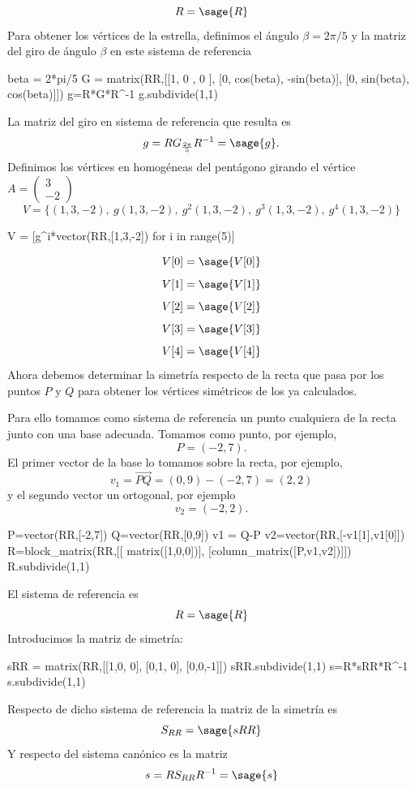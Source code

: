 \documentclass{amsart}
\begin{document}
 \[R= \sage{R} \]
Para obtener los vértices de la estrella, definimos el ángulo $\beta = 2\pi/5$ y la matriz del giro de ángulo $\beta$ en este sistema de referencia

\begin{sageblock}
beta = 2*pi/5
G = matrix(RR,[[1, 0        ,  0        ],
            [0, cos(beta), -sin(beta)],
            [0, sin(beta),  cos(beta)]])
g=R*G*R^-1
g.subdivide(1,1)
\end{sageblock}

La matriz del giro en sistema de referencia que resulta es \[g=RG_{\frac{2\pi}{5}} R^{-1}= \sage{g}.\]
Definimos los vértices en homogéneas del pentágono girando el vértice $A = \left( \begin{array}{r} 3  \\ -2 \end{array} \right)$
$$V=\{(1,3,-2), \ g(1,3,-2), \ g^2(1,3,-2), \ g^3(1,3,-2), \ g^4(1,3,-2) \}$$

\begin{sageblock}
V = [g^i*vector(RR,[1,3,-2]) for i in range(5)]
\end{sageblock}
$$V[0]=\sage{V[0]}$$
$$V[1]=\sage{V[1]}$$
$$V[2]=\sage{V[2]}$$
$$V[3]=\sage{V[3]}$$
$$V[4]=\sage{V[4]}$$
Ahora debemos determinar la simetría respecto de la recta que pasa por los puntos $P$ y $Q$ para obtener los vértices simétricos de los ya calculados.

Para ello tomamos como sistema de referencia un punto cualquiera de la recta junto con una base adecuada. Tomamos como punto, por ejemplo, $$P = (-2,7).$$ El primer vector de la base lo tomamos sobre la recta, por ejemplo, $$v_1 = \vec{PQ}= (0,9) - (-2,7) = (2,2)$$ y el segundo vector un ortogonal, por ejemplo $$v_2 = (-2,2).$$

\begin{sageblock}
P=vector(RR,[-2,7])
Q=vector(RR,[0,9])
v1 = Q-P
v2=vector(RR,[-v1[1],v1[0]])
R=block_matrix(RR,[[       matrix([1,0,0])],
                [column_matrix([P,v1,v2])]])
R.subdivide(1,1)
\end{sageblock}

El sistema de referencia es \[ R = \sage{R} \]
Introducimos la matriz de simetría:
\begin{sageblock}
sRR = matrix(RR,[[1,0, 0],
              [0,1, 0],
              [0,0,-1]])
sRR.subdivide(1,1)
s=R*sRR*R^-1
s.subdivide(1,1)
\end{sageblock}

Respecto de dicho sistema de referencia la matriz de la simetría es \[ S_{RR} = \sage{sRR} \] Y respecto del sistema canónico es la matriz \[ s = RS_{RR}R^{-1} = \sage{s} \]
\end{document}
